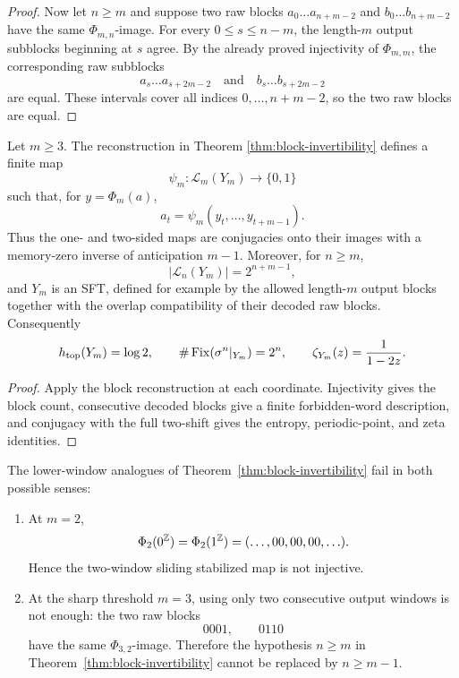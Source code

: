 \begin{proof}
Now let $n\ge m$ and suppose two raw blocks
$a_0\ldots a_{n+m-2}$ and $b_0\ldots b_{n+m-2}$ have the same
$\Phi_{m,n}$-image.  For every $0\le s\le n-m$, the length-$m$ output
subblocks beginning at $s$ agree.  By the already proved injectivity of
$\Phi_{m,m}$, the corresponding raw subblocks
\[
a_s\ldots a_{s+2m-2}
\quad\text{and}\quad
b_s\ldots b_{s+2m-2}
\]
are equal.  These intervals cover all indices $0,\ldots,n+m-2$, so the two
raw blocks are equal.
\end{proof}

\begin{corollary}
\label{cor:explicit-decoder}
Let $m\ge3$.  The reconstruction in Theorem
\ref{thm:block-invertibility} defines a finite map
\[
\psi_m:\mathcal L_m(Y_m)\longrightarrow\{0,1\}
\]
such that, for $y=\Phi_m(a)$,
\[
a_t=\psi_m(y_t,\ldots,y_{t+m-1}).
\]
Thus the one- and two-sided maps are conjugacies onto their images with a
memory-zero inverse of anticipation $m-1$.  Moreover, for $n\ge m$,
\[
|\mathcal L_n(Y_m)|=2^{n+m-1},
\]
and $Y_m$ is an SFT, defined for example by the allowed length-$m$ output
blocks together with the overlap compatibility of their decoded raw blocks.
Consequently
\[
h_{\rm top}(Y_m)=\log2,\qquad
\#\operatorname{Fix}(\sigma^n|_{Y_m})=2^n,
\qquad \zeta_{Y_m}(z)=\frac1{1-2z}.
\]
\end{corollary}

\begin{proof}
Apply the block reconstruction at each coordinate.  Injectivity gives the
block count, consecutive decoded blocks give a finite forbidden-word
description, and conjugacy with the full two-shift gives the entropy,
periodic-point, and zeta identities.
\end{proof}

\begin{proposition}\label{prop:low-window-counterexamples}
The lower-window analogues of Theorem~\ref{thm:block-invertibility} fail in
both possible senses:
\begin{enumerate}[label=(\roman*),leftmargin=*,itemsep=2pt]
  \item At $m=2$,
  \[
  \Phi_2(0^{\mathbb{Z}})=\Phi_2(1^{\mathbb{Z}})=(\ldots,00,00,00,\ldots).
  \]
  Hence the two-window sliding stabilized map is not injective.
  \item At the sharp threshold $m=3$, using only two consecutive output
  windows is not enough: the two raw blocks
  \[
  0001,\qquad 0110
  \]
  have the same $\Phi_{3,2}$-image.  Therefore the hypothesis
  $n\ge m$ in Theorem~\ref{thm:block-invertibility} cannot be replaced by
  $n\ge m-1$.
\end{enumerate}
\end{proposition}


